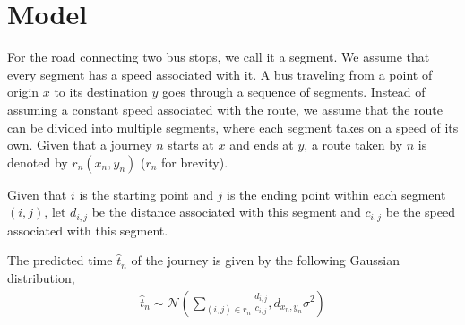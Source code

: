 \documentclass{sig-alternate}
\begin{document}
\section{Model}

For the road connecting two bus stops, we call it a segment. We assume that every segment has a speed associated with it. A bus traveling from a point of origin $x$ to its destination $y$ goes through a sequence of segments. Instead of assuming a constant speed associated with the route, we assume that the route can be divided into multiple segments, where each segment takes on a speed of its own. Given that a journey $n$ starts at $x$ and ends at $y$, a route taken by $n$ is denoted by $r_n(x_n, y_n)$ ($r_n$ for brevity).

Given that $i$ is the starting point and $j$ is the ending point within each segment $(i, j)$, let $d_{i,j}$ be the distance associated with this segment and $c_{i,j}$ be the speed associated with this segment.

The predicted time $\hat{t}_n$ of the journey is given by the following Gaussian distribution,
\begin{gather}
\hat{t}_n \sim \mathcal{N} \left( \sum_{ (i,j) \in r_n } \frac{ d_{i,j} }{ c_{i,j} }, d_{x_n, y_n} \sigma^2 \right)
\end{gather}
\end{document}
